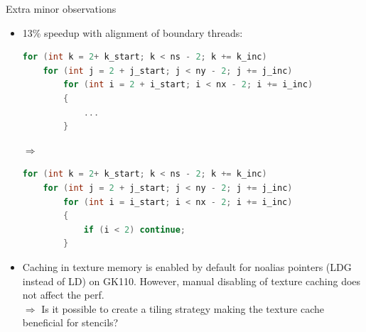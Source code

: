 \documentclass[aspectratio=169]{beamer}
\begin{document}
\begin{frame}[fragile]{Extra minor observations}

\begin{itemize}
\item 13\% speedup with alignment of boundary threads:\\
\begin{minipage}{6.7cm}
\begin{lstlisting}[language=c, basicstyle=\tiny]
for (int k = 2+ k_start; k < ns - 2; k += k_inc)
    for (int j = 2 + j_start; j < ny - 2; j += j_inc)
        for (int i = 2 + i_start; i < nx - 2; i += i_inc)
        {
            ...
        }
\end{lstlisting}
\end{minipage}%
\hskip10pt$\Rightarrow$\hskip10pt
\begin{minipage}{6.5cm}
\begin{lstlisting}[language=c, basicstyle=\tiny]
for (int k = 2+ k_start; k < ns - 2; k += k_inc)
    for (int j = 2 + j_start; j < ny - 2; j += j_inc)
        for (int i = i_start; i < nx - 2; i += i_inc)
        {
            if (i < 2) continue;
        }
\end{lstlisting}
\end{minipage}
\item Caching in texture memory is enabled by default for noalias pointers (LDG instead of LD) on GK110. However, manual disabling of texture caching does not affect the perf.\\ $\Rightarrow$ Is it possible to create a tiling strategy making the texture cache beneficial for stencils?
\end{itemize}

\end{frame}
\end{document}
